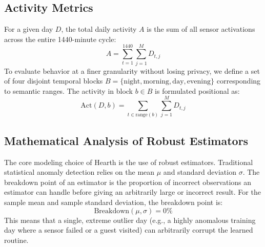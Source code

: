 \documentclass[conference]{IEEEtran}
\begin{document}
\subsection{Activity Metrics}
For a given day $D$, the total daily activity $A$ is the sum of all sensor activations across the entire 1440-minute cycle:
\begin{equation}
A = \sum_{t=1}^{1440} \sum_{j=1}^{M} D_{t, j}
\end{equation}
To evaluate behavior at a finer granularity without losing privacy, we define a set of four disjoint temporal blocks $B = \{\text{night}, \text{morning}, \text{day}, \text{evening}\}$ corresponding to semantic ranges. The activity in block $b \in B$ is formulated positional as:
\begin{equation}
\text{Act}(D, b) = \sum_{t \in \text{range}(b)} \sum_{j=1}^{M} D_{t, j}
\end{equation}

\subsection{Mathematical Analysis of Robust Estimators}
The core modeling choice of Hearth is the use of robust estimators. Traditional statistical anomaly detection relies on the mean $\mu$ and standard deviation $\sigma$. The breakdown point of an estimator is the proportion of incorrect observations an estimator can handle before giving an arbitrarily large or incorrect result. For the sample mean and sample standard deviation, the breakdown point is:
\begin{equation}
\text{Breakdown}(\mu, \sigma) = 0\%
\end{equation}
This means that a single, extreme outlier day (e.g., a highly anomalous training day where a sensor failed or a guest visited) can arbitrarily corrupt the learned routine. 
\end{document}
